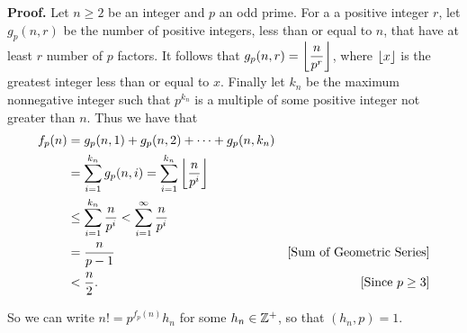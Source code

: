 \begin{enumerate}
      \textbf{Proof.} Let $n \ge 2$ be an integer and $p$ an odd prime. For a
      a positive integer $r$, let $g_p(n, r)$ be the number of positive
      integers, less than or equal to $n$, that have at least $r$ number of $p$ 
      factors. It follows that $g_p(n, r) = \displaystyle\left\lfloor \frac{n}{p^r} \right\rfloor$, where
      $\left\lfloor x \right\rfloor$ is the greatest integer less than or equal to $x$. Finally let
      $k_n$ be the maximum nonnegative integer such that $p^{k_n}$ is a multiple
      of some positive integer not greater than $n$. Thus we have that
      \begin{align*}
         f_p(n) &= g_p(n, 1) + g_p(n, 2) + \cdots + g_p(n, k_n) \\
            &= \sum_{i=1}^{k_n} g_p(n, i)
            = \sum_{i=1}^{k_n} \left\lfloor \frac{n}{p^i} \right\rfloor \\
            &\le \sum_{i=1}^{k_n} \frac{n}{p^i}
            < \sum_{i=1}^\infty \frac{n}{p^i} \\
            &= \frac{n}{p-1} &[\text{Sum of Geometric Series}] \\
            &< \frac{n}{2}. &[\text{Since }p \ge 3]
      \end{align*}

      So we can write $n! = p^{f_p(n)} h_n$ for some $h_n \in \mathbb{Z}^+$, so that
      $(h_n, p) = 1$.


\end{enumerate}
